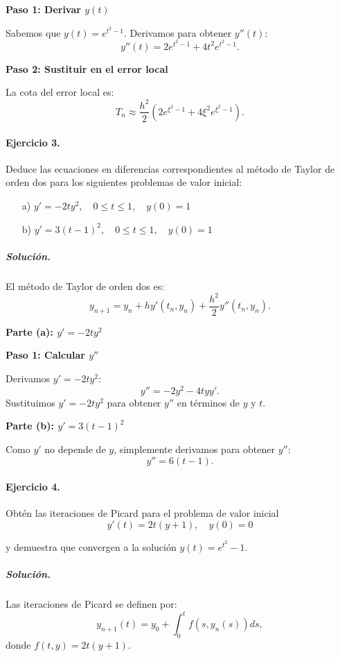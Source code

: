 \documentclass[12pt,letterpaper,oneside]{article}
\begin{document}
\textbf{Paso 1: Derivar $y(t)$}

Sabemos que $y(t) = e^{t^2 - 1}$. Derivamos para obtener $y''(t)$:
\[
y''(t) = 2e^{t^2 - 1} + 4t^2 e^{t^2 - 1}.
\]

\textbf{Paso 2: Sustituir en el error local}

La cota del error local es:
\[
T_n \approx \frac{h^2}{2} \left( 2e^{\xi^2 - 1} + 4\xi^2 e^{\xi^2 - 1} \right).
\]

\paragraph*{Ejercicio 3.} Deduce las ecuaciones en diferencias correspondientes al método de Taylor de orden dos para los siguientes problemas de valor inicial:
\begin{itemize}
    \item[a)] $y'=-2ty^2,\quad 0\leq t\leq 1,\quad y(0)=1$
    \item[b)] $y'=3(t-1)^2,\quad 0\leq t\leq 1,\quad y(0)=1$
\end{itemize}

\subparagraph*{Solución.}

El método de Taylor de orden dos es:
\[
y_{n+1} = y_n + h y'(t_n, y_n) + \frac{h^2}{2} y''(t_n, y_n).
\]

\textbf{Parte (a): $y'=-2ty^2$}

\textbf{Paso 1: Calcular $y''$}

Derivamos $y' = -2ty^2$:
\[
y'' = -2y^2 - 4tyy'.
\]
Sustituimos $y' = -2ty^2$ para obtener $y''$ en términos de $y$ y $t$.

\textbf{Parte (b): $y' = 3(t-1)^2$}

Como $y'$ no depende de $y$, simplemente derivamos para obtener $y''$:
\[
y'' = 6(t-1).
\]

\paragraph*{Ejercicio 4.} Obtén las iteraciones de Picard para el problema de valor inicial
\begin{equation}
y'(t) = 2t(y+1),\quad y(0)=0 \label{eq-3}
\end{equation}

\noindent y demuestra que convergen a la solución $y(t)=e^{t^2}-1$.

\subparagraph*{Solución.}

Las iteraciones de Picard se definen por:
\[
y_{n+1}(t) = y_0 + \int_0^t f(s, y_n(s)) ds,
\]
donde $f(t, y) = 2t(y+1)$.
\end{document}
